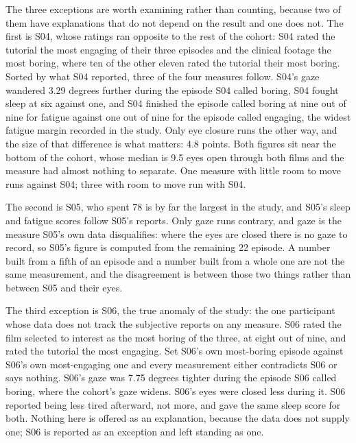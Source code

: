 The three exceptions are worth examining rather than counting, because two of them have
explanations that do not depend on the result and one does not. The first is S04, whose ratings
ran opposite to the rest of the cohort: S04 rated the tutorial the most engaging of their three
episodes and the clinical footage the most boring, where ten of the other eleven rated the
tutorial their most boring. Sorted by what S04 reported, three of the four measures follow.
S04's gaze wandered 3.29 degrees further during the episode S04 called boring, S04 fought sleep
at six against one, and S04 finished the episode called boring at nine out of nine for fatigue
against one out of nine for the episode called engaging, the widest fatigue margin recorded in
the study. Only eye closure runs the other way, and the size of that difference is what
matters: 4.8%
points. Both figures sit near the bottom of the cohort, whose median is 9.5%
eyes open through both films and the measure had almost nothing to separate. One measure with
little room to move runs against S04; three with room to move run with S04.

The second is S05, who spent 78%
is by far the largest in the study, and S05's sleep and fatigue scores follow S05's reports.
Only gaze runs contrary, and gaze is the measure S05's own data disqualifies: where the eyes are
closed there is no gaze to record, so S05's figure is computed from the remaining 22%
episode. A number built from a fifth of an episode and a number built from a whole one are not
the same measurement, and the disagreement is between those two things rather than between S05
and their eyes.

The third exception is S06, the true anomaly of the study: the one participant whose data does
not track the subjective reports on any measure. S06 rated the film selected to interest
as the most boring of the three, at eight out of nine, and rated the tutorial the most engaging.
Set S06's own most-boring episode against S06's own most-engaging one and every measurement
either contradicts S06 or says nothing. S06's gaze was 7.75 degrees tighter during the episode
S06 called boring, where the cohort's gaze widens. S06's eyes were closed less during it. S06
reported being less tired afterward, not more, and gave the same sleep score for both. Nothing
here is offered as an explanation, because the data does not supply one; S06 is reported as an
exception and left standing as one.

